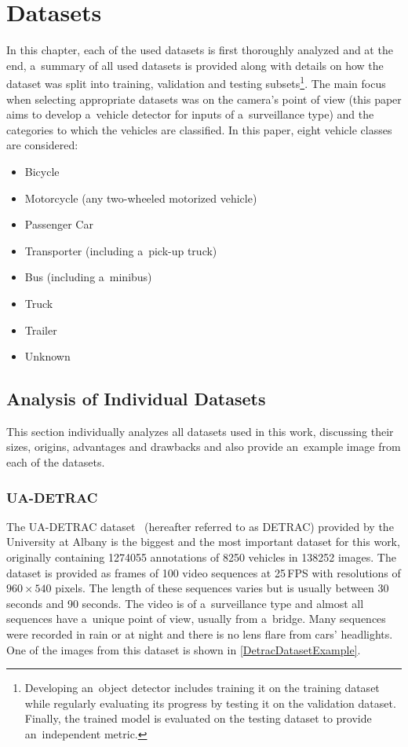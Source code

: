 \chapter{Datasets}
\label{DatasetsChapter}

In this chapter, each of the used datasets is first thoroughly analyzed and at
the end, a~summary of all used datasets is provided along with details on how
the dataset was split into training, validation and testing
subsets\footnote{Developing an~object detector includes training it on the
training dataset while regularly evaluating its progress by testing it on the
validation dataset. Finally, the trained model is evaluated on the testing
dataset to provide an~independent metric.}. The main focus when selecting
appropriate datasets was on the camera's point of view (this paper aims to
develop a~vehicle detector for inputs of a~surveillance type) and the categories
to which the vehicles are classified. In this paper, eight vehicle classes are
considered:
\begin{itemize}
    \item Bicycle
    \item Motorcycle (any two-wheeled motorized vehicle)
    \item Passenger Car
    \item Transporter (including a~pick-up truck)
    \item Bus (including a~minibus)
    \item Truck
    \item Trailer
    \item Unknown
\end{itemize}


\section{Analysis of Individual Datasets}

This section individually analyzes all datasets used in this work, discussing
their sizes, origins, advantages and drawbacks and also provide an~example image
from each of the datasets.


\subsection{UA-DETRAC}
\label{DetracDataset}

The UA-DETRAC dataset~\cite{detrac} (hereafter referred to as DETRAC) provided
by the University at Albany is the biggest and the most important dataset for
this work, originally containing \num{1274055} annotations of \num{8250}
vehicles in \num{138252} images. The dataset is provided as frames of 100 video
sequences at 25\,FPS with resolutions of $960 \times 540$ pixels. The length of
these sequences varies but is usually between 30 seconds and 90 seconds. The
video is of a~surveillance type and almost all sequences have a~unique point of
view, usually from a~bridge. Many sequences were recorded in rain or at night
and there is no lens flare from cars' headlights. One of the images from this
dataset is shown in \autoref{DetracDatasetExample}.

